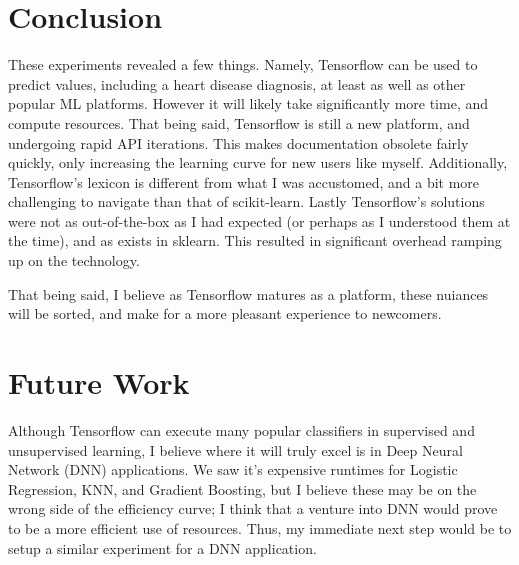 \documentclass[conference]{IEEEtran}
\begin{document}
\section{Conclusion}
These experiments revealed a few things. Namely, Tensorflow can be used to predict values, including a heart disease diagnosis, at least as well as other popular ML platforms. However it will likely take significantly more time, and compute resources. That being said, Tensorflow is still a new platform, and undergoing rapid API iterations. This makes documentation obsolete fairly quickly, only increasing the learning curve for new users like myself. Additionally, Tensorflow's lexicon is different from what I was accustomed, and a bit more challenging to navigate than that of scikit-learn. Lastly Tensorflow's solutions were not as out-of-the-box as I had expected (or perhaps as I understood them at the time), and as exists in sklearn. This resulted in significant overhead ramping up on the technology.

That being said, I believe as Tensorflow matures as a platform, these nuiances will be sorted, and make for a more pleasant experience to newcomers. 

\section{Future Work}
Although Tensorflow can execute many popular classifiers in supervised and unsupervised learning, I believe where it will truly excel is in Deep Neural Network (DNN) applications. We saw it's expensive runtimes for Logistic Regression, KNN, and Gradient Boosting, but I believe these may be on the wrong side of the efficiency curve; I think that a venture into DNN would prove to be a more efficient use of resources. Thus, my immediate next step would be to setup a similar experiment for a DNN application.  
\end{document}
